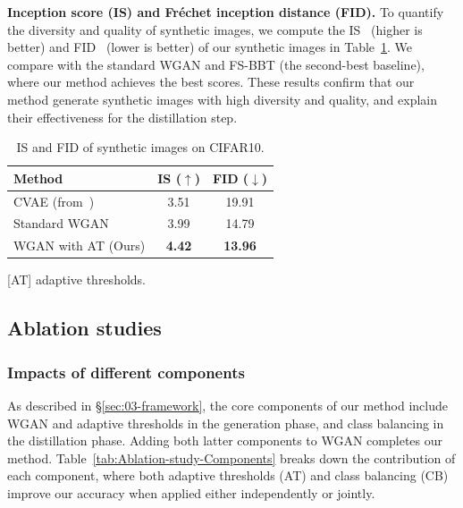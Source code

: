 \begin{foldable}
  \textbf{Inception score (IS) and Fr\'{e}chet inception distance (FID).} To quantify the diversity and quality of synthetic images, we compute the IS~\cite{salimans2016improved} (higher is better) and FID~\cite{heusel2017gans} (lower is better) of our synthetic images in Table~\ref{tab:IS-FID}.
  We compare with the standard WGAN and FS-BBT (the second-best baseline), where our method achieves the best scores.
  These results confirm that our method generate synthetic images with high diversity and quality, and explain their effectiveness for the distillation step.
\end{foldable}

\begin{table}[ht]
  \centering
  \begin{threeparttable}
    \caption{IS and FID of synthetic images on CIFAR10.}
    \label{tab:IS-FID}
    \begin{tabular}{l c c}
      \toprule
      \textbf{Method} & \textbf{IS ($\uparrow$)} & \textbf{FID ($\downarrow$)} \\
      \midrule
      CVAE (from~\cite{nguyen2022black}) & 3.51          & 19.91 \\
      Standard WGAN                      & 3.99          & 14.79 \\
      WGAN with AT (Ours)                & \textbf{4.42} & \textbf{13.96} \\
      \bottomrule
    \end{tabular}
    \begin{tablenotes}[flushleft] \footnotesize
    \item {[AT] adaptive thresholds.}
    \end{tablenotes}
  \end{threeparttable}
\end{table}

\subsection{Ablation studies}

\subsubsection{Impacts of different components}
\begin{foldable}

  As described in \S\ref{sec:03-framework}, the core components of our method include WGAN and adaptive thresholds in the generation phase, and class balancing in the distillation phase.
  Adding both latter components to WGAN completes our method.
  Table~\ref{tab:Ablation-study-Components} breaks down the contribution of each component, where both adaptive thresholds (AT) and class balancing (CB) improve our accuracy when applied either independently or jointly.
\end{foldable}


